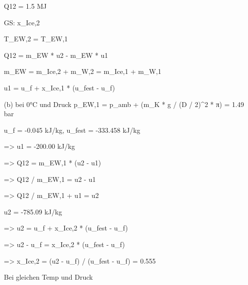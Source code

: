 Q12 = 1.5 MJ  

GS: x_Ice,2  

T_EW,2 = T_EW,1  

Q12 = m_EW * u2 - m_EW * u1  

m_EW = m_Ice,2 + m_W,2 = m_Ice,1 + m_W,1  

u1 = u_f + x_Ice,1 * (u_fest - u_f)  

(b) bei 0°C und Druck p_EW,1 = p_amb + (m_K * g / (D / 2)^2 * π) = 1.49 bar  

u_f = -0.045 kJ/kg, u_fest = -333.458 kJ/kg  

=> u1 = -200.00 kJ/kg  

=> Q12 = m_EW,1 * (u2 - u1)  

=> Q12 / m_EW,1 = u2 - u1  

=> Q12 / m_EW,1 + u1 = u2  

u2 = -785.09 kJ/kg  

=> u2 = u_f + x_Ice,2 * (u_fest - u_f)  

=> u2 - u_f = x_Ice,2 * (u_fest - u_f)  

=> x_Ice,2 = (u2 - u_f) / (u_fest - u_f) = 0.555  

Bei gleichen Temp und Druck